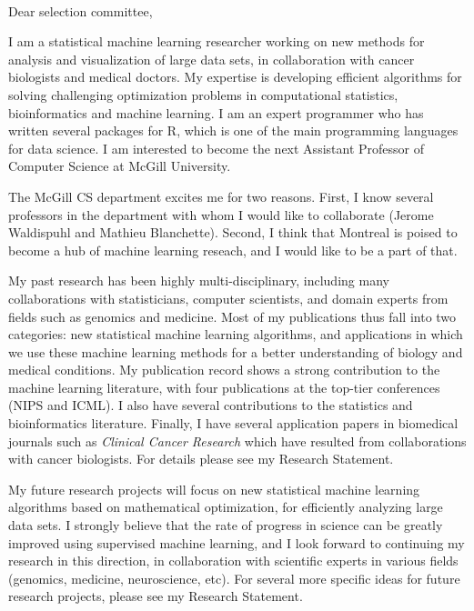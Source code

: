 \documentclass{article}
\begin{document}
\mbox{ }

Dear selection committee,

I am a statistical machine learning researcher working on new methods
for analysis and visualization of large data sets, in collaboration
with cancer biologists and medical doctors. My expertise is
developing efficient algorithms for solving challenging optimization
problems in computational statistics, bioinformatics and machine
learning. I am an expert programmer who has written several packages
for R, which is one of the main programming languages for data
science. I am interested to become the next Assistant Professor of
Computer Science at McGill University.

The McGill CS department excites me for two reasons. First, I know
several professors in the department with whom I would like to
collaborate (Jerome Waldispuhl and Mathieu Blanchette). Second, I
think that Montreal is poised to become a hub of machine learning
reseach, and I would like to be a part of that.

My past research has been highly multi-disciplinary, including many
collaborations with 
statisticians,
 computer scientists,
and domain experts from fields such as genomics and medicine. 
Most of my
publications thus fall into two categories: new statistical machine
learning algorithms, and applications in which we use these machine
learning methods for a better understanding of 
biology and medical conditions. 
My publication record shows a strong
contribution to the machine learning literature, with four
publications at the top-tier conferences (NIPS and ICML). I also have
several contributions to the statistics 
and bioinformatics 
literature.
Finally, I have several application papers in biomedical journals such
as {\it Clinical Cancer Research} which have resulted from
collaborations with cancer biologists. For details please see my
Research Statement. 

My future research projects will focus on new statistical machine
learning algorithms based on mathematical optimization, for
efficiently analyzing large data sets. I strongly believe that the
rate of progress in science can be greatly improved using supervised
machine learning, and I look forward to continuing my research in this
direction, in collaboration with scientific experts in various fields
(genomics, medicine, neuroscience, etc). For several more specific
ideas for future research projects, please see my Research Statement.
\end{document}
